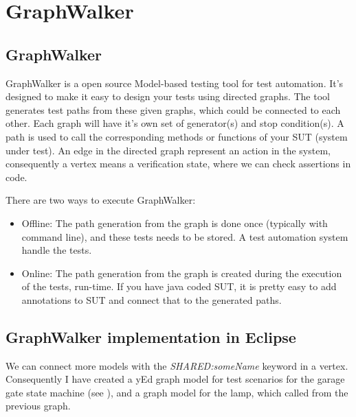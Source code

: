 \chapter{GraphWalker}\label{sect:GraphWalker implementation of Garage Gate model}
\section{GraphWalker}

GraphWalker is a open source Model-based testing tool for test automation. It's designed to make it easy to design your tests using directed graphs. The tool generates test paths from these given graphs, which could be connected to each other. Each graph will have it's own set of generator(s) and stop condition(s). A path is used to call the corresponding methods or functions of your SUT (system under test). An edge in the directed graph represent an action in the system, consequently a vertex means a verification state, where we can check assertions in code. 


There are two ways to execute GraphWalker:
\begin{itemize}
	\item Offline: The path generation from the graph is done once (typically with command line), and these tests needs to be stored. A test automation system handle the tests. 
	\item Online: The path generation from the graph is created during the execution of the tests, run-time. If you have java coded SUT, it is pretty easy to add annotations to SUT and connect that to the generated paths.
\end{itemize}


\section{GraphWalker implementation in Eclipse}

 We can connect more models with the \textit{SHARED:someName} keyword in a vertex. Consequently I have created a yEd graph model for test scenarios for the garage gate state machine (see ), and a graph model for the lamp, which called from the previous graph.

